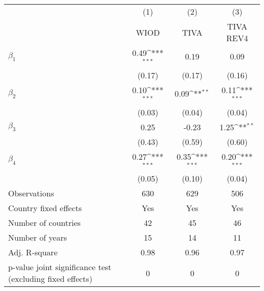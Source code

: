 {
\def\sym#1{\ifmmode^{#1}\else\(^{#1}\)\fi}
\begin{tabular}{l*{3}{c}}
\toprule
                    &\multicolumn{1}{c}{(1)}&\multicolumn{1}{c}{(2)}&\multicolumn{1}{c}{(3)}\\
                    &\multicolumn{1}{c}{WIOD}&\multicolumn{1}{c}{TIVA}&\multicolumn{1}{c}{TIVA REV4}\\
\midrule
$ \beta_{1} $       &        0.49\sym{***}&        0.19         &        0.09         \\
                    &      (0.17)         &      (0.17)         &      (0.16)         \\
\addlinespace
$ \beta_{2} $       &        0.10\sym{***}&        0.09\sym{**} &        0.11\sym{***}\\
                    &      (0.03)         &      (0.04)         &      (0.04)         \\
\addlinespace
$ \beta_{3} $       &        0.25         &       -0.23         &        1.25\sym{**} \\
                    &      (0.43)         &      (0.59)         &      (0.60)         \\
\addlinespace
$ \beta_{4} $       &        0.27\sym{***}&        0.35\sym{***}&        0.20\sym{***}\\
                    &      (0.05)         &      (0.10)         &      (0.04)         \\
\midrule
Observations        &         630         &         629         &         506         \\
Country fixed effects&         Yes         &         Yes         &         Yes         \\
Number of countries &          42         &          45         &          46         \\
Number of years     &          15         &          14         &          11         \\
Adj. R-square       &        0.98         &        0.96         &        0.97         \\
p-value joint significance test (excluding fixed effects)&           0         &           0         &           0         \\
\bottomrule
\end{tabular}
}

